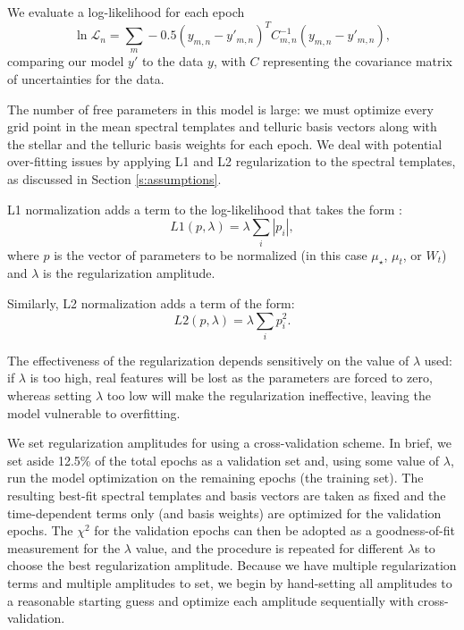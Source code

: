 \documentclass[modern]{aastex62}
\begin{document}
We evaluate a log-likelihood for each epoch
\begin{equation}
\ln \mathcal{L}_n = \sum_{m} -0.5 (y_{m,n} - y'_{m,n})^T C_{m,n}^{-1} (y_{m,n}-y'_{m,n}),
\end{equation}
comparing our model $y'$ to the data $y$, with $C$ representing the covariance matrix of uncertainties for the data.

The number of free parameters in this model is large: we must optimize every grid point in the mean spectral templates and telluric basis vectors along with the stellar \RV and the telluric basis weights for each epoch.
We deal with potential over-fitting issues by applying L1 and L2 regularization to the spectral templates, as discussed in Section \ref{s:assumptions}.

L1 normalization adds a term to the log-likelihood that takes the form :
$$ L1(p, \lambda) = \lambda \sum_{i} | p_{i} | ,$$
where $p$ is the vector of parameters to be normalized (in this case $\mu_{{\star}}$, $\mu_{{t}}$, or $W_{t}$) and $\lambda$ is the regularization amplitude.

Similarly, L2 normalization adds a term of the form:
$$ L2(p, \lambda) = \lambda \sum_{i} p_{i}^2 .$$

The effectiveness of the regularization depends sensitively on the value of $\lambda$ used: if $\lambda$ is too high, real features will be lost as the parameters are forced to zero, whereas setting $\lambda$ too low will make the regularization ineffective, leaving the model vulnerable to overfitting.

We set regularization amplitudes for \wobble using a cross-validation scheme.
In brief, we set aside 12.5\% of the total epochs as a validation set and, using some value of $\lambda$, run the model optimization on the remaining epochs (the training set).
The resulting best-fit spectral templates and basis vectors are taken as fixed and the time-dependent terms only (\RVs and basis weights) are optimized for the validation epochs.
The $\chi^2$ for the validation epochs can then be adopted as a goodness-of-fit measurement for the $\lambda$ value, and the procedure is repeated for different $\lambda$s to choose the best regularization amplitude.
Because we have multiple regularization terms and multiple amplitudes to set, we begin by hand-setting all amplitudes to a reasonable starting guess and optimize each amplitude sequentially with cross-validation.
\end{document}

